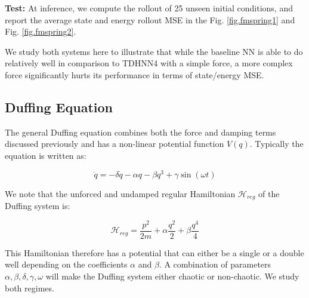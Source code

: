 \documentclass[twoside]{article}
\begin{document}
\textbf{Test:} At inference, we compute the rollout of 25 unseen initial conditions, and report the average state and energy rollout MSE in the Fig. \ref{fig.fmspring1} and Fig. \ref{fig.fmspring2}.

We study both systems here to illustrate that while the baseline NN is able to do relatively well in comparison to TDHNN4 with a simple force, a more complex force significantly hurts its performance in terms of state/energy MSE.

\subsection{Duffing Equation}

The general Duffing equation combines both the force and damping terms discussed previously and has a non-linear potential function $V(q)$. Typically the equation is written as:

\begin{equation}
\ddot{q} = -\delta \dot{q} -\alpha q -\beta q^3 +\gamma \sin(\omega t) 
\end{equation}

We note that the unforced and undamped regular Hamiltonian $\mathcal{H}_{reg}$ of the Duffing system is:

\begin{equation}
\mathcal{H}_{reg} = \frac{p^2}{2m}+ \alpha \frac{q^2}{2} + \beta \frac{q^4}{4}
\end{equation}

This Hamiltonian therefore has a potential that can either be a single or a double well depending on the coefficients $\alpha$ and $\beta$. A combination of parameters $\alpha,\beta,\delta,\gamma,\omega$ will make the Duffing system either chaotic or non-chaotic. We study both regimes.
\end{document}
